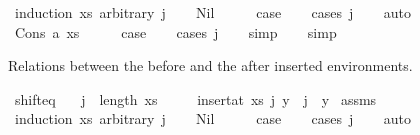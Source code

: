 \begin{isabellebody}
\ {\isacharparenleft}{\kern0pt}induction\ xs\ arbitrary{\isacharcolon}{\kern0pt}\ j{\isacharparenright}{\kern0pt}\isanewline
\ \ \isamarkupfalse%
\ Nil\isanewline
\ \ \isamarkupfalse%
\ \isamarkupfalse%
\ {\isacharquery}{\kern0pt}case\isanewline
\ \ \isamarkupfalse%
\ {\isacharparenleft}{\kern0pt}cases\ j{\isacharparenright}{\kern0pt}\isanewline
\ \ \isamarkupfalse%
\ auto\isanewline
\ \ \isamarkupfalse%
\isanewline
{}\isamarkupfalse%
\isanewline
\ \ \isamarkupfalse%
\ {\isacharparenleft}{\kern0pt}Cons\ a\ xs{\isacharparenright}{\kern0pt}\isanewline
\ \ \isamarkupfalse%
\ \isamarkupfalse%
\ {\isacharquery}{\kern0pt}case\isanewline
\ \ \isamarkupfalse%
\ {\isacharparenleft}{\kern0pt}cases\ j{\isacharparenright}{\kern0pt}\isanewline
\ \ \isamarkupfalse%
\ simp\isanewline
\ \ \isamarkupfalse%
\ simp\isanewline
{}\isamarkupfalse%
%
\endisatagproof
{\isafoldproof}%
%
\isadelimproof
%
\endisadelimproof
%
\begin{isamarkuptext}%
Relations between the before and the after inserted environments.%
\end{isamarkuptext}\isamarkuptrue%
\isamarkupfalse%
\ shift{\isacharunderscore}{\kern0pt}eq{\isacharcolon}{\kern0pt}\isanewline
\ \ \ {\isachardoublequoteopen}j\ {\isasymle}\ length\ xs{\isachardoublequoteclose}\isanewline
\ \ \ \ \ {\isachardoublequoteopen}{\isacharparenleft}{\kern0pt}insert{\isacharunderscore}{\kern0pt}at\ xs\ j\ y{\isacharparenright}{\kern0pt}\ {\isacharbang}{\kern0pt}\ j\ {\isacharequal}{\kern0pt}\ y{\isachardoublequoteclose}\isanewline
%
\isadelimproof
%
\endisadelimproof
%
\isatagproof
{}\isamarkupfalse%
\ assms\isanewline
{}\isamarkupfalse%
\ {\isacharparenleft}{\kern0pt}induction\ xs\ arbitrary{\isacharcolon}{\kern0pt}\ j{\isacharparenright}{\kern0pt}\isanewline
\ \ \isamarkupfalse%
\ Nil\isanewline
\ \ \isamarkupfalse%
\ \isamarkupfalse%
\ {\isacharquery}{\kern0pt}case\isanewline
\ \ \isamarkupfalse%
\ {\isacharparenleft}{\kern0pt}cases\ j{\isacharparenright}{\kern0pt}\isanewline
\ \ \isamarkupfalse%
\ auto\isanewline
\ \ \isamarkupfalse%
\isanewline
{}\isamarkupfalse%

\end{isabellebody}
